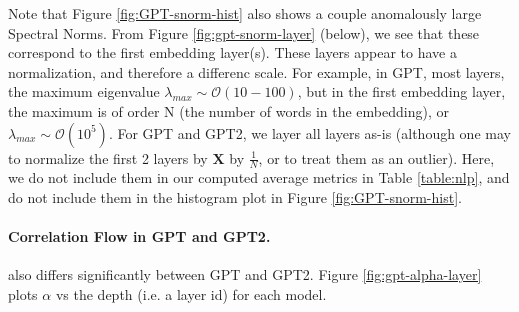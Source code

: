 Note that Figure \ref{fig:GPT-snorm-hist} also shows a couple anomalously  large Spectral Norms.
From Figure \ref{fig:gpt-snorm-layer} (below), we see that these correspond to the first embedding layer(s).
These layers appear to have a normalization, and therefore a differenc scale.
For example, in GPT, most layers, the maximum eigenvalue $\lambda_{max}\sim\mathcal{O}(10-100)$,
but in the first embedding layer, the maximum is of order N (the number of words in the embedding), or
 $\lambda_{max}\sim\mathcal{O}(10^{5})$.  For GPT and GPT2, we layer all layers as-is (although one may to normalize
the first 2 layers by  $\mathbf{X}$ by $\frac{1}{N}$, or to treat them as an outlier).
Here, we do not include them in our computed average metrics in Table \ref{table:nlp},
and do not include them in the histogram plot in Figure \ref{fig:GPT-snorm-hist}.


\paragraph{Correlation Flow in GPT and GPT2.} 

also differs significantly between GPT and GPT2.
Figure \ref{fig:gpt-alpha-layer} plots $\alpha$ vs the depth (i.e. a layer id) for each model.


